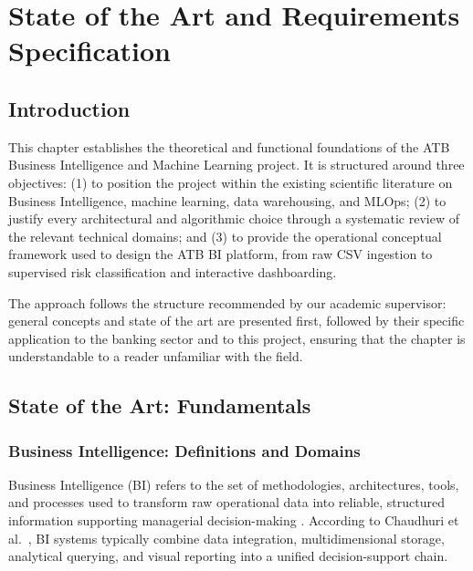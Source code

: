 \chapter{State of the Art and Requirements Specification}

\section{Introduction}

This chapter establishes the theoretical and functional foundations of the ATB Business
Intelligence and Machine Learning project. It is structured around three objectives:
(1) to position the project within the existing scientific literature on Business Intelligence,
machine learning, data warehousing, and MLOps; (2) to justify every architectural and
algorithmic choice through a systematic review of the relevant technical domains; and
(3) to provide the operational conceptual framework used to design the ATB BI platform,
from raw CSV ingestion to supervised risk classification and interactive dashboarding.

The approach follows the structure recommended by our academic supervisor: general concepts
and state of the art are presented first, followed by their specific application to the
banking sector and to this project, ensuring that the chapter is understandable to a reader
unfamiliar with the field.


\section{State of the Art: Fundamentals}

\subsection{Business Intelligence: Definitions and Domains}

Business Intelligence (BI) refers to the set of methodologies, architectures, tools, and
processes used to transform raw operational data into reliable, structured information
supporting managerial decision-making \cite{chaudhuri2011}. According to Chaudhuri et al.\
\cite{chaudhuri2011}, BI systems typically combine data integration, multidimensional
storage, analytical querying, and visual reporting into a unified decision-support chain.

